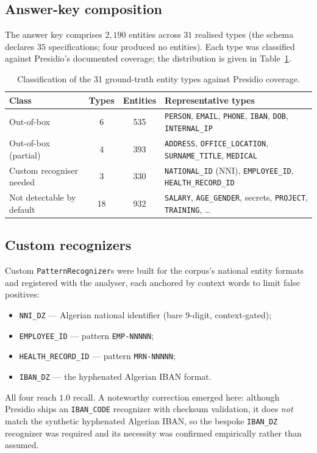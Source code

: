 \documentclass[11pt,a4paper]{article}
\newcommand{\code}[1]{\texttt{\small #1}}
\begin{document}
\subsection{Answer-key composition}
The answer key comprises $2{,}190$ entities across $31$ realised types (the schema declares $35$ specifications; four produced no entities). Each type was classified against Presidio's documented coverage; the distribution is given in Table~\ref{tab:presidioclass}.

\begin{table}[h]
\centering
\caption{Classification of the 31 ground-truth entity types against Presidio coverage.}
\label{tab:presidioclass}
\begin{tabular}{l c c p{6.4cm}}
\toprule
\textbf{Class} & \textbf{Types} & \textbf{Entities} & \textbf{Representative types} \\
\midrule
Out-of-box & 6 & 535 & \code{PERSON}, \code{EMAIL}, \code{PHONE}, \code{IBAN}, \code{DOB}, \code{INTERNAL\_IP} \\
Out-of-box (partial) & 4 & 393 & \code{ADDRESS}, \code{OFFICE\_LOCATION}, \code{SURNAME\_TITLE}, \code{MEDICAL} \\
Custom recogniser needed & 3 & 330 & \code{NATIONAL\_ID} (NNI), \code{EMPLOYEE\_ID}, \code{HEALTH\_RECORD\_ID} \\
Not detectable by default & 18 & 932 & \code{SALARY}, \code{AGE\_GENDER}, secrets, \code{PROJECT}, \code{TRAINING}, \ldots \\
\bottomrule
\end{tabular}
\end{table}

\subsection{Custom recognizers}
Custom \code{PatternRecognizer}s were built for the corpus's national entity formats and registered with the analyser, each anchored by context words to limit false positives:
\begin{itemize}[leftmargin=1.4cm]
\item \code{NNI\_DZ} --- Algerian national identifier (bare 9-digit, context-gated);
\item \code{EMPLOYEE\_ID} --- pattern \code{EMP-NNNNN};
\item \code{HEALTH\_RECORD\_ID} --- pattern \code{MRN-NNNNN};
\item \code{IBAN\_DZ} --- the hyphenated Algerian IBAN format.
\end{itemize}
All four reach $1.0$ recall. A noteworthy correction emerged here: although Presidio ships an \code{IBAN\_CODE} recognizer with checksum validation, it does \emph{not} match the synthetic hyphenated Algerian IBAN, so the bespoke \code{IBAN\_DZ} recognizer was required and its necessity was confirmed empirically rather than assumed.
\end{document}
